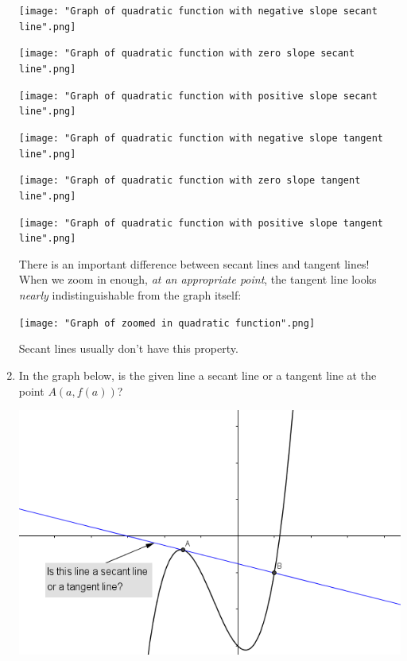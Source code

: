 \documentclass[nooutcomes]{ximera}
\begin{document}
\begin{problem}
\begin{enumerate}
\begin{freeResponse} \hfil
	\begin{image}
           \texttt{[image: "Graph of quadratic function with negative slope secant line".png]}
         \end{image}
         \begin{image}
           \texttt{[image: "Graph of quadratic function with zero slope secant line".png]}
         \end{image}
         \begin{image}
           \texttt{[image: "Graph of quadratic function with positive slope secant line".png]}
         \end{image}
          \begin{image}
            \texttt{[image: "Graph of quadratic function with negative slope tangent line".png]}
          \end{image}
          \begin{image}
            \texttt{[image: "Graph of quadratic function with zero slope tangent line".png]}
          \end{image}
          \begin{image}
            \texttt{[image: "Graph of quadratic function with positive slope tangent line".png]}
          \end{image}
          There is an important difference between secant lines and tangent lines!
          When we zoom in enough, \emph{at an appropriate point}, the tangent line looks \emph{nearly} indistinguishable from the graph itself:
          \begin{image}
            \texttt{[image: "Graph of zoomed in quadratic function".png]}
          \end{image}
          Secant lines usually don't have this property.
	\end{freeResponse}

		\item In the graph below, is the given line a secant line or a tangent line at the point $A(a,f(a))$?
		\begin{image}
		 \includegraphics[scale = 0.7]{figure1.png}
		\end{image}


\end{enumerate}
\end{problem}
\end{document}

